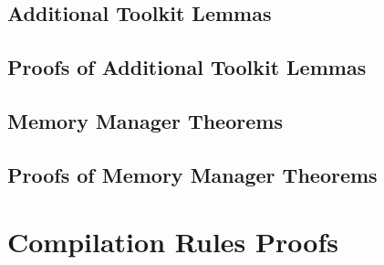 \documentclass[a4paper,11pt]{report}
\begin{document}
\section{Additional Toolkit Lemmas}
\label{additional-lemmas}
\normalsize

 

\section{Proofs of Additional Toolkit Lemmas}
\label{additional-lemmas-proofs}
\scriptsize





\section{Memory Manager Theorems}
\label{memory-manager-theorems}
\normalsize



\section{Proofs of Memory Manager Theorems}
\label{memory-manager-proofs}
\scriptsize



\chapter{Compilation Rules Proofs}
\label{compilation-rules-proofs-appendix}


\end{document}
